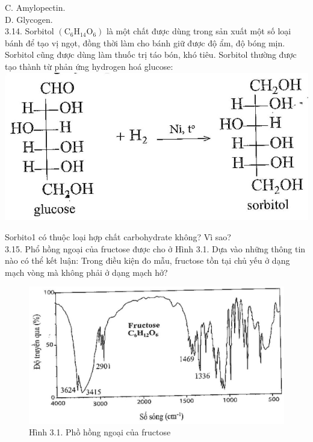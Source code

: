 \documentclass[10pt]{article}
\begin{document}
C. Amylopectin.\\
D. Glycogen.\\
3.14. Sorbitol $\left(\mathrm{C}_{6} \mathrm{H}_{14} \mathrm{O}_{6}\right)$ là một chất được dùng trong sản xuất một số loại bánh để tạo vị ngọt, đồng thời làm cho bánh giữ được độ ẩm, độ bóng mịn. Sorbitol cũng được dùng làm thuốc trị táo bón, khó tiêu. Sorbitol thường được tạo thành từ phản ứng hydrogen hoá glucose:\\
\includegraphics[max width=\textwidth, center]{2025_10_23_80c1361fcdcd395cad8eg-10}

Sorbito1 có thuộc loại hợp chất carbohydrate không? Vì sao?\\
3.15. Phổ hồng ngoại của fructose được cho ở Hình 3.1. Dựa vào những thông tin nào có thể kết luận: Trong điều kiện đo mẫu, fructose tồn tại chủ yếu ở dạng mạch vòng mà không phải ở dạng mạch hở?

\begin{figure}[h]
\begin{center}
  \includegraphics[width=\textwidth]{2025_10_23_80c1361fcdcd395cad8eg-10(1)}
\captionsetup{labelformat=empty}
\caption{Hình 3.1. Phồ hồng ngoại của fructose}
\end{center}
\end{figure}
\end{document}
